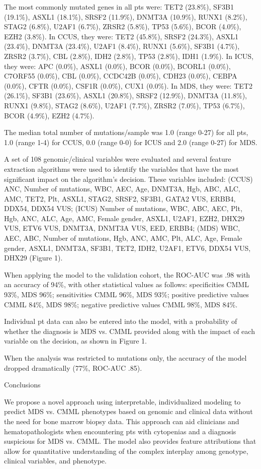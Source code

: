 The most commonly mutated genes in all pts were: TET2 (23.8\%), SF3B1 (19.1\%), ASXL1 (18.1\%), SRSF2 (11.9\%), DNMT3A (10.9\%), RUNX1 (8.2\%), STAG2 (6.8\%), U2AF1 (6.7\%), ZRSR2 (5.8\%), TP53 (5.6\%), BCOR (4.0\%), EZH2 (3.8\%). In CCUS, they were: TET2 (45.8\%), SRSF2 (24.3\%), ASXL1 (23.4\%), DNMT3A (23.4\%), U2AF1 (8.4\%), RUNX1 (5.6\%), SF3B1 (4.7\%), ZRSR2 (3.7\%), CBL (2.8\%), IDH2 (2.8\%), TP53 (2.8\%), IDH1 (1.9\%). In ICUS, they were: APC (0.0\%), ASXL1 (0.0\%), BCOR (0.0\%), BCORL1 (0.0\%), C7ORF55 (0.0\%), CBL (0.0\%), CCDC42B (0.0\%), CDH23 (0.0\%), CEBPA (0.0\%), CFTR (0.0\%), CSF1R (0.0\%), CUX1 (0.0\%). In MDS, they were: TET2 (26.1\%), SF3B1 (23.6\%), ASXL1 (20.8\%), SRSF2 (12.9\%), DNMT3A (11.8\%), RUNX1 (9.8\%), STAG2 (8.6\%), U2AF1 (7.7\%), ZRSR2 (7.0\%), TP53 (6.7\%), BCOR (4.9\%), EZH2 (4.7\%).

The median total number of mutations/sample was 1.0 (range 0-27) for all pts, 1.0 (range 1-4) for CCUS, 0.0 (range 0-0) for ICUS and 2.0 (range 0-27) for MDS.


A set of 108 genomic/clinical variables were evaluated and several feature extraction algorithms were used to identify the variables that have the most significant impact on the algorithm's decision. These variables included: (CCUS) ANC, Number of mutations, WBC, AEC, Age, DNMT3A, Hgb, ABC, ALC, AMC, TET2, Plt, ASXL1, STAG2, SRSF2, SF3B1, GATA2 VUS, ERBB4, DDX54, DDX54 VUS; (ICUS) Number of mutations, WBC, ABC, AEC, Plt, Hgb, ANC, ALC, Age, AMC, Female gender, ASXL1, U2AF1, EZH2, DHX29 VUS, ETV6 VUS, DNMT3A, DNMT3A VUS, EED, ERBB4; (MDS) WBC, AEC, ABC, Number of mutations, Hgb, ANC, AMC, Plt, ALC, Age, Female gender, ASXL1, DNMT3A, SF3B1, TET2, IDH2, U2AF1, ETV6, DDX54 VUS, DHX29 (Figure 1).

When applying the model to the validation cohort, the ROC-AUC was .98 with an accuracy of 94\%, with other statistical values as follows: specificities CMML 93\%, MDS 96\%; sensitivities CMML 96\%, MDS 93\%; positive predictive values CMML 84\%, MDS 98\%; negative predictive values CMML 98\%, MDS 84\%.

Individual pt data can also be entered into the model, with a probability of whether the diagnosis is MDS vs. CMML provided along with the impact of each variable on the decision, as shown in Figure 1.

When the analysis was restricted to mutations only, the accuracy of the model dropped dramatically (77\%, ROC-AUC .85).


Conclusions

We propose a novel approach using interpretable, individualized modeling to predict MDS vs. CMML phenotypes based on genomic and clinical data without the need for bone marrow biopsy data. This approach can aid clinicians and hematopathologists when encountering pts with cytopenias and a diagnosis suspicious for MDS vs. CMML. The model also provides feature attributions that allow for quantitative understanding of the complex interplay among genotype, clinical variables, and phenotype.


